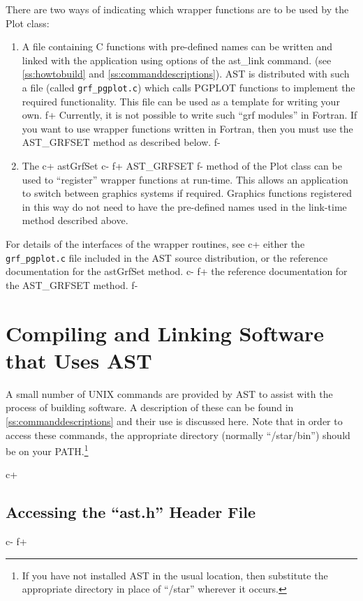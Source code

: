 \documentclass[twoside,11pt]{article}
\newcommand{\appref}[1]{Appendix~\ref{#1}}
\newcommand{\secref}[1]{\S\ref{#1}}
\renewcommand{\appref}[1]{\ref{#1}}
\renewcommand{\secref}[1]{\ref{#1}}
\begin{document}
There are two ways of indicating which wrapper functions are to be used by 
the Plot class:
\begin{enumerate}

\item A file containing C functions with pre-defined names can be written
and linked with the application using options of the ast\_link command.
(see \secref{ss:howtobuild} and \appref{ss:commanddescriptions}). AST is
distributed with such a file (called {\tt grf\_pgplot.c}) which calls PGPLOT 
functions to implement the required functionality. This file can be used
as a template for writing your own.
f+
Currently, it is not possible to write such ``grf modules'' in Fortran.
If you want to use wrapper functions written in Fortran, then you must 
use the AST\_GRFSET method as described below.
f-

\item The 
c+
astGrfSet 
c-
f+
AST\_GRFSET
f-
method of the Plot class can be used to ``register''
wrapper functions at run-time. This allows an application to switch
between graphics systems if required. Graphics functions registered in
this way do not need to have the pre-defined names used in the link-time
method described above.

\end{enumerate}

For details of the interfaces of the wrapper routines, see 
c+
either the {\tt grf\_pgplot.c} file included in the AST source
distribution, or the reference documentation for the astGrfSet method.
c-
f+
the reference documentation for the AST\_GRFSET method.
f-

\cleardoublepage
\section{Compiling and Linking Software that Uses AST}

A small number of UNIX commands are provided by AST to assist with the
process of building software. A description of these can be found in
\appref{ss:commanddescriptions} and their use is discussed here.  Note
that in order to access these commands, the appropriate directory
(normally ``/star/bin'') should be on your PATH.\footnote{If you have
not installed AST in the usual location, then substitute the
appropriate directory in place of ``/star'' wherever it occurs.}

c+
\subsection{\label{ss:accessingheaderfile}Accessing the ``ast.h'' Header File}
c-
f+
\end{document}
